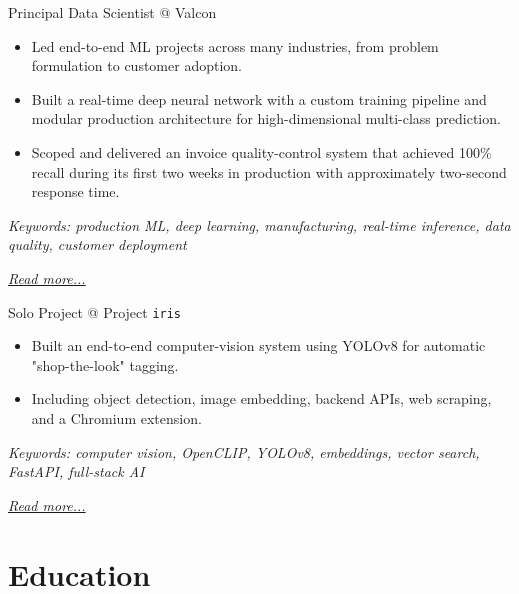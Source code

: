 \documentclass[11pt,a4paper]{moderncv}
\begin{document}
\large{Principal Data Scientist @ Valcon}
\normalsize
\begin{itemize}
    \item Led end-to-end ML projects across many industries, from problem formulation to customer adoption.
    \item Built a real-time deep neural network with a custom training pipeline and modular production architecture for high-dimensional multi-class prediction.
    \item Scoped and delivered an invoice quality-control system that achieved 100\% recall during its first two weeks in production with approximately two-second response time.
\end{itemize}

{\footnotesize\textit{Keywords: production ML, deep learning, manufacturing, real-time inference, data quality, customer deployment}}

\hfill{\small{\textit{\hyperref[sec:valcon]{Read more...}}}}

\large{Solo Project @ Project \texttt{iris}}
\normalsize
\begin{itemize}
    \item Built an end-to-end computer-vision system using YOLOv8 for automatic "shop-the-look" tagging.
    \item Including object detection, image embedding, backend APIs, web scraping, and a Chromium extension.
\end{itemize}

{\footnotesize\textit{Keywords: computer vision, OpenCLIP, YOLOv8, embeddings, vector search, FastAPI, full-stack AI}}

\hfill{\small{\textit{\hyperref[sec:iris]{Read more...}}}}

\section{Education}

\end{document}
